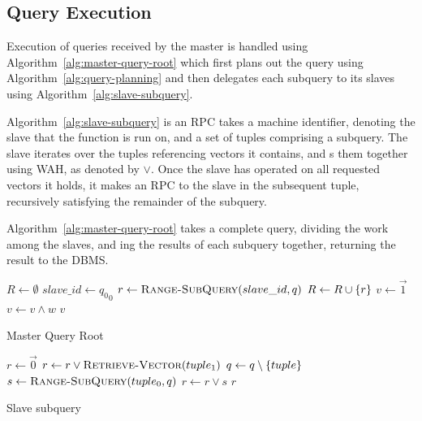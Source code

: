 \subsection{Query Execution}
Execution of queries received by the master is handled using
Algorithm~\ref{alg:master-query-root} which first plans out the query using
Algorithm~\ref{alg:query-planning} and then delegates each subquery to its slaves using
Algorithm~\ref{alg:slave-subquery}.\par
Algorithm~\ref{alg:slave-subquery} is an RPC takes a machine identifier, denoting
the slave that the function is run on, and a set of tuples comprising a subquery.
The slave iterates over the tuples referencing vectors it contains, and s
them together using WAH, as denoted by \(\lor\). Once the slave has operated on all
requested vectors it holds, it makes an RPC to the slave in the subsequent tuple,
recursively satisfying the remainder of the subquery.\par
Algorithm~\ref{alg:master-query-root} takes a complete query, dividing the work
among the slaves, and ing the results of each subquery together,
returning the result to the DBMS.
%
\begin{algorithm}
    \begin{algorithmic}
            \State $R \gets \emptyset$
                \State $slave\_id \gets {q_0}_0$
                \State $r \gets \Call{Range-SubQuery}{slave\_id, q}$
                \State $R \gets R \cup \left\{r\right\}$
            \EndFor
            \State $v \gets \vec{1}$
                \State $v \gets v \land w$
            \EndFor
            \State \Return $v$
        \EndProcedure
    \end{algorithmic}
    \caption{Master Query Root}
    \label{alg:master-query-root}
\end{algorithm}
%
\begin{algorithm}
    \begin{algorithmic}
            \State $r \gets \vec{0}$
                    \State $r \gets r \lor \Call{Retrieve-Vector}{tuple_1}$
                    \State $q \gets q \setminus \left\{tuple\right\}$
                \Else
                    \State $s \gets \Call{Range-SubQuery}{tuple_0, q}$
                    \State $r \gets r \lor s$
                    \State \Break
                \EndIf
            \EndFor
            \State \Return $r$
        \EndProcedure
    \end{algorithmic}
    \caption{Slave subquery}
    \label{alg:slave-subquery}
\end{algorithm}
%
